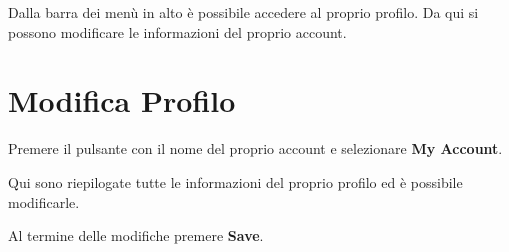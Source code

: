 Dalla barra dei menù in alto è possibile accedere al proprio profilo.
Da qui si possono modificare le informazioni del proprio account.

\section{Modifica Profilo}

Premere il pulsante con il nome del proprio account e selezionare \textbf{My Account}.


\noindent Qui sono riepilogate tutte le informazioni del proprio profilo ed è possibile modificarle.

\noindent Al termine delle modifiche premere \textbf{Save}.
